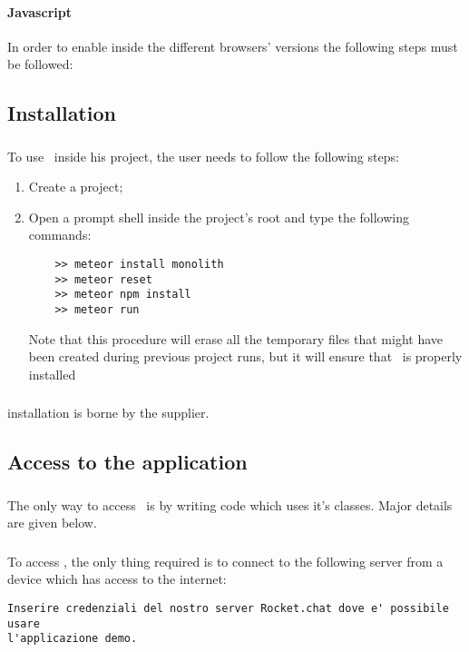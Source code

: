 \paragraph{Javascript}
In order to enable  inside the different browsers' versions the following steps must be followed:


\subsection{Installation}
\subsubsection{\progettoShort}
To use \progettoShort\ inside his project, the user needs to follow the following steps:
\begin{enumerate}
	\item Create a  project;
	\item Open a prompt shell inside the project's root and type the following commands:
	\begin{lstlisting}
	>> meteor install monolith
	>> meteor reset
	>> meteor npm install
	>> meteor run
	\end{lstlisting}
	Note that this procedure will erase all the temporary files that might have been created during previous project runs, but it will ensure that \progettoShort\ is properly installed
\end{enumerate}

\subsubsection{\app}
\app installation is borne by the supplier.

\subsection{Access to the application}
\subsubsection{\progettoShort}
The only way to access \progettoShort\ is by writing code which uses it's classes. Major details are given below.

\subsubsection{\app}
To access \app, the only thing required is to connect to the following  server from a device which has access to the internet:
\begin{lstlisting}
Inserire credenziali del nostro server Rocket.chat dove e' possibile usare 
l'applicazione demo.
\end{lstlisting}


\newpage